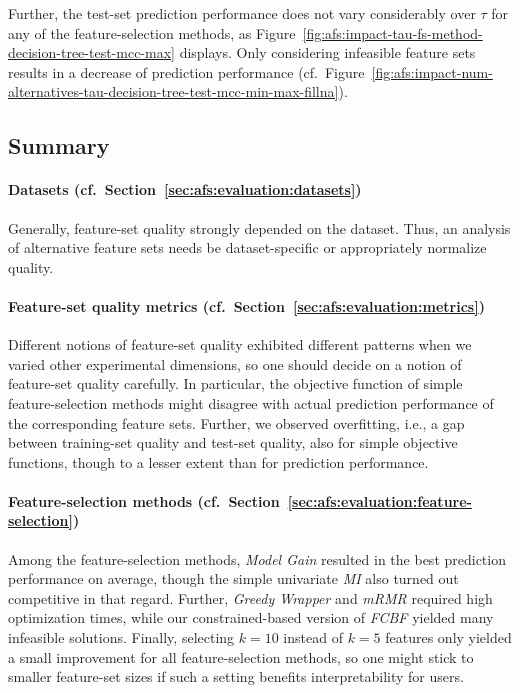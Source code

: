 \documentclass{article}
\theoremstyle{definition}
\begin{document}
Further, the test-set prediction performance does not vary considerably over $\tau$ for any of the feature-selection methods, as Figure~\ref{fig:afs:impact-tau-fs-method-decision-tree-test-mcc-max} displays.
Only considering infeasible feature sets results in a decrease of prediction performance (cf.~Figure~\ref{fig:afs:impact-num-alternatives-tau-decision-tree-test-mcc-min-max-fillna}).

\subsection{Summary}
\label{sec:afs:evaluation:summary}

\paragraph{Datasets (cf.~Section~\ref{sec:afs:evaluation:datasets})}

Generally, feature-set quality strongly depended on the dataset.
Thus, an analysis of alternative feature sets needs be dataset-specific or appropriately normalize quality.

\paragraph{Feature-set quality metrics (cf.~Section~\ref{sec:afs:evaluation:metrics})}

Different notions of feature-set quality exhibited different patterns when we varied other experimental dimensions, so one should decide on a notion of feature-set quality carefully.
In particular, the objective function of simple feature-selection methods might disagree with actual prediction performance of the corresponding feature sets.
Further, we observed overfitting, i.e., a gap between training-set quality and test-set quality, also for simple objective functions, though to a lesser extent than for prediction performance.

\paragraph{Feature-selection methods (cf.~Section~\ref{sec:afs:evaluation:feature-selection})}

Among the feature-selection methods, \emph{Model Gain} resulted in the best prediction performance on average, though the simple univariate \emph{MI} also turned out competitive in that regard.
Further, \emph{Greedy Wrapper} and \emph{mRMR} required high optimization times, while our constrained-based version of \emph{FCBF} yielded many infeasible solutions.
Finally, selecting $k=10$ instead of $k=5$ features only yielded a small improvement for all feature-selection methods, so one might stick to smaller feature-set sizes if such a setting benefits interpretability for users.
\end{document}
